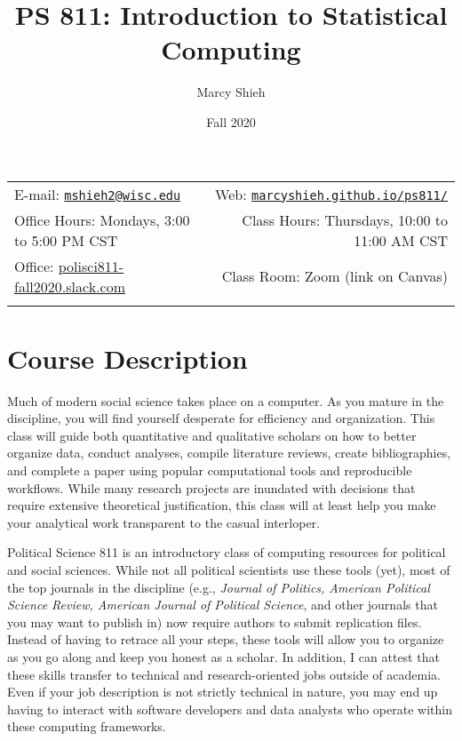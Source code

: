 \documentclass[11pt,]{article}
\title{PS 811: Introduction to Statistical Computing}
\author{Marcy Shieh}
\date{Fall 2020}
\begin{document}
  

		\maketitle
		
	
		\thispagestyle{firststyle}



	\noindent \begin{tabular*}{\textwidth}{ @{\extracolsep{\fill}} lr @{\extracolsep{\fill}}}


E-mail: \texttt{\href{mailto:mshieh2@wisc.edu}{\nolinkurl{mshieh2@wisc.edu}}} & Web: \href{http://marcyshieh.github.io/ps811/}{\tt marcyshieh.github.io/ps811/}\\
Office Hours: Mondays, 3:00 to 5:00 PM CST  &  Class Hours: Thursdays, 10:00 to 11:00 AM CST\\
Office: \url{polisci811-fall2020.slack.com}  & Class Room: Zoom (link on Canvas)\\
	&  \\
	\hline
	\end{tabular*}
	
\vspace{2mm}
	


\hypertarget{course-description}{%
\section{Course Description}\label{course-description}}

Much of modern social science takes place on a computer. As you mature
in the discipline, you will find yourself desperate for efficiency and
organization. This class will guide both quantitative and qualitative
scholars on how to better organize data, conduct analyses, compile
literature reviews, create bibliographies, and complete a paper using
popular computational tools and reproducible workflows. While many
research projects are inundated with decisions that require extensive
theoretical justification, this class will at least help you make your
analytical work transparent to the casual interloper.

Political Science 811 is an introductory class of computing resources
for political and social sciences. While not all political scientists
use these tools (yet), most of the top journals in the discipline (e.g.,
\emph{Journal of Politics, American Political Science Review, American
Journal of Political Science}, and other journals that you may want to
publish in) now require authors to submit replication files. Instead of
having to retrace all your steps, these tools will allow you to organize
as you go along and keep you honest as a scholar. In addition, I can
attest that these skills transfer to technical and research-oriented
jobs outside of academia. Even if your job description is not strictly
technical in nature, you may end up having to interact with software
developers and data analysts who operate within these computing
frameworks.
\end{document}
